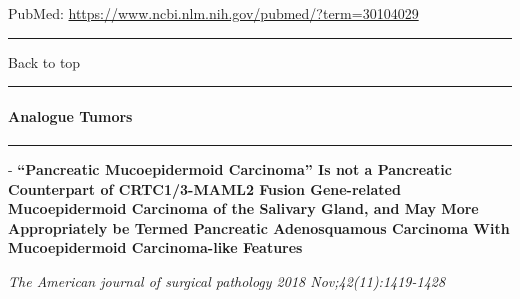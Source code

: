 \documentclass[]{article}
\let\oldparagraph\paragraph
\renewcommand{\paragraph}[1]{\oldparagraph{#1}\mbox{}}
\begin{document}
PubMed: \url{https://www.ncbi.nlm.nih.gov/pubmed/?term=30104029}

{}

{}

\begin{center}\rule{0.5\linewidth}{\linethickness}\end{center}

Back to top

\begin{center}\rule{0.5\linewidth}{\linethickness}\end{center}

\pagebreak

\hypertarget{analogue-tumors}{%
\paragraph{Analogue Tumors}\label{analogue-tumors}}

\begin{center}\rule{0.5\linewidth}{\linethickness}\end{center}

 - \textbf{``Pancreatic Mucoepidermoid Carcinoma'' Is not a Pancreatic
Counterpart of CRTC1/3-MAML2 Fusion Gene-related Mucoepidermoid
Carcinoma of the Salivary Gland, and May More Appropriately be Termed
Pancreatic Adenosquamous Carcinoma With Mucoepidermoid Carcinoma-like
Features}

\emph{The American journal of surgical pathology 2018
Nov;42(11):1419-1428}
\end{document}
